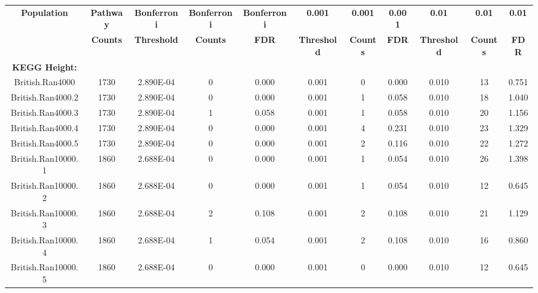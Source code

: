 \documentclass[12pt, a4paper]{article}
\begin{document}

\setlength{\footskip}{4cm}
\begin{landscape}
\begin{table}[ht]
\vspace*{-1.25cm}
\centering
\hspace*{-3.25cm}
\begin{tabular}{ccccccccccc}
  \hline
\textbf{Population} & \textbf{Pathway} & \textbf{Bonferroni} & \textbf{Bonferroni} & \textbf{Bonferroni} & \textbf{0.001} & \textbf{0.001} & \textbf{0.001} & \textbf{0.01} & \textbf{0.01} & \textbf{0.01} \\
 & \textbf{Counts} & \textbf{Threshold} & \textbf{Counts} & \textbf{FDR} & \textbf{Threshold} & \textbf{Counts} & \textbf{FDR} & \textbf{Threshold} & \textbf{Counts} & \textbf{FDR} \\ 
  \hline
\textbf{KEGG Height:} & & & & & & & & & \\
British.Ran4000 & 1730 & 2.890E-04 & 0 & 0.000 & 0.001 & 0 & 0.000 & 0.010 & 13 & 0.751 \\
  British.Ran4000.2 & 1730 & 2.890E-04 & 0 & 0.000 & 0.001 & 1 & 0.058 & 0.010 & 18 & 1.040 \\
  British.Ran4000.3 & 1730 & 2.890E-04 & 1 & 0.058 & 0.001 & 1 & 0.058 & 0.010 & 20 & 1.156 \\
  British.Ran4000.4 & 1730 & 2.890E-04 & 0 & 0.000 & 0.001 & 4 & 0.231 & 0.010 & 23 & 1.329 \\
  British.Ran4000.5 & 1730 & 2.890E-04 & 0 & 0.000 & 0.001 & 2 & 0.116 & 0.010 & 22 & 1.272 \\
  British.Ran10000.1 & 1860 & 2.688E-04 & 0 & 0.000 & 0.001 & 1 & 0.054 & 0.010 & 26 & 1.398 \\
  British.Ran10000.2 & 1860 & 2.688E-04 & 0 & 0.000 & 0.001 & 1 & 0.054 & 0.010 & 12 & 0.645 \\
  British.Ran10000.3 & 1860 & 2.688E-04 & 2 & 0.108 & 0.001 & 2 & 0.108 & 0.010 & 21 & 1.129 \\
  British.Ran10000.4 & 1860 & 2.688E-04 & 1 & 0.054 & 0.001 & 2 & 0.108 & 0.010 & 16 & 0.860 \\
  British.Ran10000.5 & 1860 & 2.688E-04 & 0 & 0.000 & 0.001 & 0 & 0.000 & 0.010 & 12 & 0.645 \\

\end{tabular}
\end{table}
\end{landscape}
\end{document}

